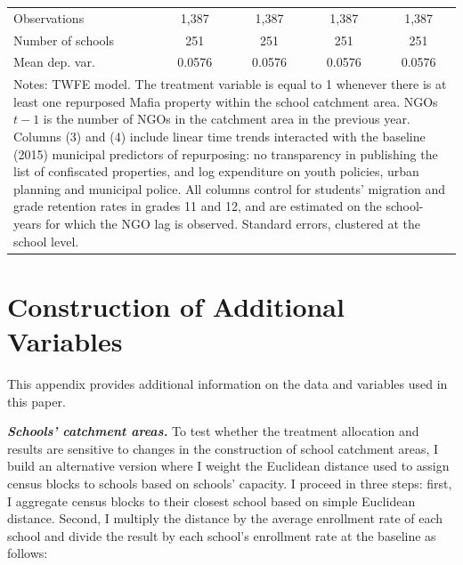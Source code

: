 \documentclass[12pt]{article}
\theoremstyle{plain}
\theoremstyle{plain}
\theoremstyle{plain}
\theoremstyle{definition}
\theoremstyle{plain}
\theoremstyle{definition}
\theoremstyle{plain}
\theoremstyle{remark}
\theoremstyle{definition}
\theoremstyle{definition}
\theoremstyle{plain}
\begin{document}
\begin{table}[H]
{\begin{tabular}{p{12.5em}llll}
    \multicolumn{1}{l}{Observations} & \multicolumn{1}{c}{1,387} & \multicolumn{1}{c}{1,387} & \multicolumn{1}{c}{1,387} & \multicolumn{1}{c}{1,387} \\
    \multicolumn{1}{l}{Number of schools} & \multicolumn{1}{c}{251} & \multicolumn{1}{c}{251} & \multicolumn{1}{c}{251} & \multicolumn{1}{c}{251} \\
    \multicolumn{1}{l}{Mean dep. var.} & \multicolumn{1}{c}{0.0576} & \multicolumn{1}{c}{0.0576} & \multicolumn{1}{c}{0.0576} & \multicolumn{1}{c}{0.0576} \\
    \midrule
    \multicolumn{5}{p{36em}}{Notes: TWFE model. The treatment variable is equal to 1 whenever there is at least one repurposed Mafia property within the school catchment area. NGOs $t-1$ is the number of NGOs in the catchment area in the previous year. Columns (3) and (4) include linear time trends interacted with the baseline (2015) municipal predictors of repurposing: no transparency in publishing the list of confiscated properties, and log expenditure on youth policies, urban planning and municipal police. All columns control for students' migration and grade retention rates in grades 11 and 12, and are estimated on the school-years for which the NGO lag is observed. Standard errors, clustered at the school level.} \\
    \end{tabular}%
    }
\end{table}


\newpage
\renewcommand{\thefigure}{D.\arabic{figure}}
\renewcommand{\thetable}{D.\arabic{table}}
\setcounter{figure}{0}
\setcounter{table}{0}

\section{Construction of Additional Variables}
\label{sec:jmp_app_D}
\vspace{-0.3cm}
This appendix provides additional information on the data and variables used in this paper. \par
\vspace{0.2cm}


    \medskip
\textbf{\emph{Schools' catchment areas.}} To test whether the treatment allocation and results are sensitive to changes in the construction of school catchment areas, I build an alternative version where I weight the Euclidean distance used to assign census blocks to schools based on schools' capacity. I proceed in three steps: first, I aggregate census blocks to their closest school based on simple Euclidean distance. Second, I multiply the distance by the average enrollment rate of each school and divide the result by each school's enrollment rate at the baseline as follows:
\end{document}
